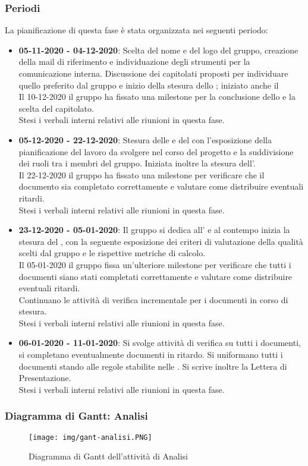 \subsubsection{Periodi}
La pianificazione di questa fase è stata organizzata nei seguenti periodo:
\begin{itemize}
\item \textbf{05-11-2020 - 04-12-2020}: Scelta del nome e del logo del gruppo, creazione della mail di riferimento e individuazione degli strumenti per la comunicazione interna. Discussione dei capitolati proposti per individuare quello preferito dal gruppo e inizio della stesura dello \SdF{} ; iniziato anche il \Glossario \\Il 10-12-2020 il gruppo ha fissato una milestone\glo{} per la conclusione dello \SdF{} e la scelta del capitolato.\\Stesi i verbali interni relativi alle riunioni in questa fase.
\item \textbf{05-12-2020 - 22-12-2020}: Stesura delle \NdP{} e del \PdP{} con l'esposizione della pianificazione del lavoro da svolgere nel corso del progetto e la suddivisione dei ruoli tra i membri del gruppo. Iniziata inoltre la stesura dell'\AdR{}.\\Il 22-12-2020 il gruppo ha fissato una milestone per verificare che il documento \NdP{} sia completato correttamente e valutare come distribuire eventuali ritardi.\\Stesi i verbali interni relativi alle riunioni in questa fase.
\item \textbf{23-12-2020 - 05-01-2020}: Il gruppo si dedica all'\AdR{} e al contempo inizia la stesura del \PdQ{}, con la seguente esposizione dei criteri di valutazione della qualità scelti dal gruppo e le rispettive metriche\glo{} di calcolo.\\Il 05-01-2020 il gruppo fissa un'ulteriore milestone per verificare che tutti i documenti siano stati completati correttamente e valutare come distribuire eventuali ritardi.\\Continuano le attività di verifica incrementale per i documenti in corso di stesura.\\Stesi i verbali interni relativi alle riunioni in questa fase.
\item \textbf{06-01-2020 - 11-01-2020}: Si svolge attività di verifica su tutti i documenti, si completano eventualmente documenti in ritardo. Si uniformano tutti i documenti stando alle regole stabilite nelle \NdP{}. Si scrive inoltre la Lettera di Presentazione.\\Stesi i verbali interni relativi alle riunioni in questa fase.
\end{itemize}
\subsubsection{Diagramma di Gantt: Analisi}
\begin{figure}[h]
	\texttt{[image: img/gant-analisi.PNG]}
	\caption{Diagramma di Gantt dell'attività di Analisi}
\end{figure}